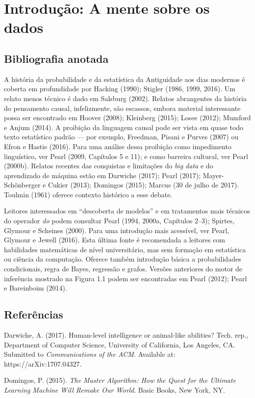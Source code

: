 \documentclass[11pt,a5paper,twoside]{book}
\begin{document}
\section{Introdução: A mente sobre os dados}
\subsection{Bibliografia anotada}
A história da probabilidade e da estatística da Antiguidade aos dias modernos é coberta em profundidade por Hacking (1990); Stigler (1986, 1999, 2016). Um relato menos técnico é dado em Salsburg (2002). Relatos abrangentes da história do pensamento causal, infelizmente, são escassos, embora material interessante possa ser encontrado em Hoover (2008); Kleinberg (2015); Losee (2012); Mumford e Anjum (2014). A proibição da linguagem causal pode ser vista em quase todo texto estatístico padrão — por exemplo, Freedman, Pisani e Purves (2007) ou Efron e Hastie (2016). Para uma análise dessa proibição como impedimento linguístico, ver Pearl (2009, Capítulos 5 e 11); e como barreira cultural, ver Pearl (2000b). Relatos recentes das conquistas e limitações do \textit{big data} e do aprendizado de máquina estão em Darwiche (2017); Pearl (2017); Mayer-Schönberger e Cukier (2013); Domingos (2015); Marcus (30 de julho de 2017). Toulmin (1961) oferece contexto histórico a esse debate.

Leitores interessados em “descoberta de modelos” e em tratamentos mais técnicos do operador \textit{do} podem consultar Pearl (1994, 2000a, Capítulos 2–3); Spirtes, Glymour e Scheines (2000). Para uma introdução mais acessível, ver Pearl, Glymour e Jewell (2016). Esta última fonte é recomendada a leitores com habilidades matemáticas de nível universitário, mas sem formação em estatística ou ciência da computação. Oferece também introdução básica a probabilidades condicionais, regra de Bayes, regressão e grafos. Versões anteriores do motor de inferência mostrado na Figura 1.1 podem ser encontradas em Pearl (2012); Pearl e Bareinboim (2014).

\subsection{Referências}
Darwiche, A. (2017). Human-level intelligence or animal-like abilities? Tech. rep., Department of Computer Science, University of California, Los Angeles, CA. Submitted to \textit{Communications of the ACM}. Available at: https://arXiv:1707.04327.

Domingos, P. (2015). \textit{The Master Algorithm: How the Quest for the Ultimate Learning Machine Will Remake Our World}. Basic Books, New York, NY.
\end{document}
